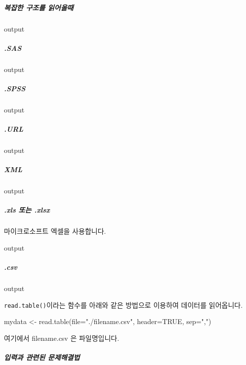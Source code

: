 \documentclass{report}
\begin{document}
\subparagraph{복잡한 구조를 읽어올때}
\begin{Schunk}
\begin{Soutput}
output
\end{Soutput}
\end{Schunk}

\subparagraph{.SAS}
\begin{Schunk}
\begin{Soutput}
output
\end{Soutput}
\end{Schunk}

\subparagraph{.SPSS}
\begin{Schunk}
\begin{Soutput}
output
\end{Soutput}
\end{Schunk}

\subparagraph{.URL}
\begin{Schunk}
\begin{Soutput}
output
\end{Soutput}
\end{Schunk}

\subparagraph{XML}
\begin{Schunk}
\begin{Soutput}
output
\end{Soutput}
\end{Schunk}

\subparagraph{.xls 또는 .xlsx}
마이크로소프트 엑셀을 사용합니다. 
\begin{Schunk}
\begin{Soutput}
output
\end{Soutput}
\end{Schunk}

\subparagraph{.csv}
\begin{Schunk}
\begin{Soutput}
output
\end{Soutput}
\end{Schunk}

\texttt{read.table()}이라는 함수를 아래와 같은 방법으로 이용하여 데이터를 읽어옵니다.

\begin{Schunk}
\begin{Soutput}
mydata <- read.table(file="./filename.csv", header=TRUE, sep=",")
\end{Soutput}
\end{Schunk}

여기에서 filename.csv 은 파일명입니다.

\subparagraph{입력과 관련된 문제해결법}
\end{document}
